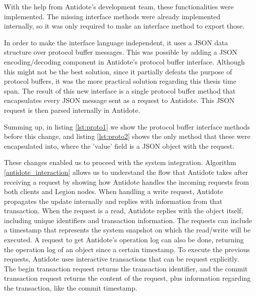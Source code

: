 \par
	With the help from Antidote's development team, these functionalities were implemented. The missing interface methods were already implemented internally, so it was only required to make an interface method to export those.\par
	In order to make the interface language independent, it uses a JSON data structure over protocol buffer messages. This was possible by adding a JSON encoding/decoding component in Antidote's protocol buffer interface. Although this might not be the best solution, since it partially defeats the purpose of protocol buffers, it was the more practical solution regarding this thesis time span. The result of this new interface is a single protocol buffer method that encapsulates every JSON message sent as a request to Antidote. This JSON request is then parsed internally in Antidote.\par
	Summing up, in listing \ref{lst:proto1} we show the protocol buffer interface methods before this change, and listing \ref{lst:proto2} shows the only method that these were encapsulated into, where the 'value' field is a JSON object with the request.\par
	These changes enabled us to proceed with the system integration. Algorithm \ref{antidote_interaction} allows us to understand the flow that Antidote takes after receiving a request by showing how Antidote handles the incoming requests from both clients and Legion nodes. When handling a write request, Antidote propagates the update internally and replies with information from that transaction. When the request is a read, Antidote replies with the object itself, including unique identifiers and transaction information. The requests can include a timestamp that represents the system snapshot on which the read/write will be executed. A request to get Antidote's operation log can also be done, returning the operation log of an object since a certain timestamp. To execute the previous requests, Antidote uses interactive transactions that can be request explicitly. The begin transaction request returns the transaction identifier, and the commit transaction request returns the content of the request, plus information regarding the transaction, like the commit timestamp.
	
